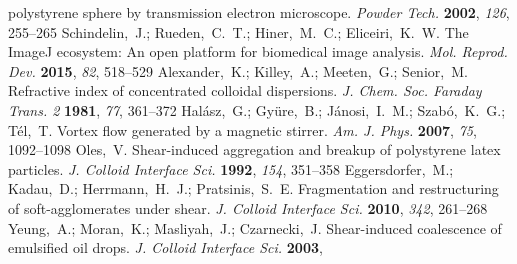 \documentclass[journal=langd5,manuscript=article]{achemso}
\begin{document}
\begin{mcitethebibliography}{47}
  polystyrene sphere by transmission electron microscope. \emph{Powder Tech.}
  \textbf{2002}, \emph{126}, 255--265\relax
\mciteBstWouldAddEndPuncttrue
\mciteSetBstMidEndSepPunct{\mcitedefaultmidpunct}
{\mcitedefaultendpunct}{\mcitedefaultseppunct}\relax
\EndOfBibitem
{}
Schindelin,~J.; Rueden,~C.~T.; Hiner,~M.~C.; Eliceiri,~K.~W. The {ImageJ}
  ecosystem: An open platform for biomedical image analysis. \emph{Mol. Reprod.
  Dev.} \textbf{2015}, \emph{82}, 518--529\relax
\mciteBstWouldAddEndPuncttrue
\mciteSetBstMidEndSepPunct{\mcitedefaultmidpunct}
{\mcitedefaultendpunct}{\mcitedefaultseppunct}\relax
\EndOfBibitem
{}
Alexander,~K.; Killey,~A.; Meeten,~G.; Senior,~M. Refractive index of
  concentrated colloidal dispersions. \emph{J. Chem. Soc. Faraday Trans. 2}
  \textbf{1981}, \emph{77}, 361--372\relax
\mciteBstWouldAddEndPuncttrue
\mciteSetBstMidEndSepPunct{\mcitedefaultmidpunct}
{\mcitedefaultendpunct}{\mcitedefaultseppunct}\relax
\EndOfBibitem
{}
Hal{\'a}sz,~G.; Gy{\"u}re,~B.; J{\'a}nosi,~I.~M.; Szab{\'o},~K.~G.; T{\'e}l,~T.
  Vortex flow generated by a magnetic stirrer. \emph{Am. J. Phys.}
  \textbf{2007}, \emph{75}, 1092--1098\relax
\mciteBstWouldAddEndPuncttrue
\mciteSetBstMidEndSepPunct{\mcitedefaultmidpunct}
{\mcitedefaultendpunct}{\mcitedefaultseppunct}\relax
\EndOfBibitem
{}
Oles,~V. Shear-induced aggregation and breakup of polystyrene latex particles.
  \emph{J. Colloid Interface Sci.} \textbf{1992}, \emph{154}, 351--358\relax
\mciteBstWouldAddEndPuncttrue
\mciteSetBstMidEndSepPunct{\mcitedefaultmidpunct}
{\mcitedefaultendpunct}{\mcitedefaultseppunct}\relax
\EndOfBibitem
{}
Eggersdorfer,~M.; Kadau,~D.; Herrmann,~H.~J.; Pratsinis,~S.~E. Fragmentation
  and restructuring of soft-agglomerates under shear. \emph{J. Colloid
  Interface Sci.} \textbf{2010}, \emph{342}, 261--268\relax
\mciteBstWouldAddEndPuncttrue
\mciteSetBstMidEndSepPunct{\mcitedefaultmidpunct}
{\mcitedefaultendpunct}{\mcitedefaultseppunct}\relax
\EndOfBibitem
{}
Yeung,~A.; Moran,~K.; Masliyah,~J.; Czarnecki,~J. Shear-induced coalescence of
  emulsified oil drops. \emph{J. Colloid Interface Sci.} \textbf{2003},

\end{mcitethebibliography}
\end{document}
